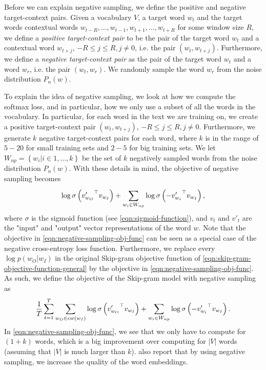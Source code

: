 Before we can explain negative sampling, we define the positive and negative target-context pairs. Given a vocabulary $V$, a target word $w_t$ and the target words contextual words $w_{t-R}, \ldots, w_{t-1}, w_{t+1}, \ldots, w_{t+R}$ for some window size $R$, we define a \textit{positive target-context pair} to be the pair of the target word $w_t$ and a contextual word $w_{t+j}$, $-R \leq j \leq R, j \neq 0$, i.e. the pair $\left( w_t, w_{t+j} \right)$. Furthermore, we define a \textit{negative target-context pair} as the pair of the target word $w_t$ and a word $w_r$, i.e. the pair $\left( w_t, w_r \right)$. We randomly sample the word $w_r$ from the noise distribution $P_n(w)$.

To explain the idea of negative sampling, we look at how we compute the softmax loss, and in particular, how we only use a subset of all the words in the vocabulary. In particular, for each word in the text we are training on, we create a positive target-context pair $\left( w_t, w_{t+j} \right)$, $-R \leq j \leq R, j \neq 0$. Furthermore, we generate $k$ negative target-context pairs for each word, where $k$ is in the range of $5-20$ for small training sets and $2-5$ for big training sets. We let $W_{np} = \left \{ w_i | i \in 1, \ldots, k \right \}$ be the set of $k$ negatively sampled words from the noise distribution $P_n(w)$. With these details in mind, the objective of negative sampling becomes \cite{mikolov2013b, rong2016word2vec}
\begin{align}
    \log \sigma \left( {v'_{w_O}}^\top v_{w_I} \right) + \sum\limits_{w_i \in W_{np}}^{} \log \sigma \left( -{v'_{w_i}}^\top v_{w_I} \right),
    \label{eqn:negative-sampling-obj-func}
\end{align}
where $\sigma$ is the sigmoid function (see \cref{eqn:sigmoid-function}), and $v_t$ and $v'_t$ are the "input" and "output" vector representations of the word $w$. Note that the objective in \cref{eqn:negative-sampling-obj-func} can be seen as a special case of the negative cross-entropy loss function. Furthermore, we replace every $\log p(w_O | w_I)$ in the original Skip-gram objective function of \cref{eqn:skip-gram-objective-function-general} by the objective in \cref{eqn:negative-sampling-obj-func}. As such, we define the objective of the Skip-gram model with negative sampling as
\begin{align}
    \frac{1}{T} \sum\limits_{t=1}^{T} \sum\limits_{w_O \in cw(w_I)}^{} \log \sigma \left( {v'_{w_O}}^\top v_{w_I} \right) + \sum\limits_{w_i \in W_{np}}^{} \log \sigma \left( -{v'_{w_i}}^\top v_{w_I} \right).
    \label{eqn:skip-gram-negative-sampling-objective}
\end{align}
In \cref{eqn:negative-sampling-obj-func}, we see that we only have to compute for $(1 + k)$ words, which is a big improvement over computing for $|V|$ words (assuming that $|V|$ is much larger than $k$). \cites{mikolov2013b} also report that by using negative sampling, we increase the quality of the word embeddings.

